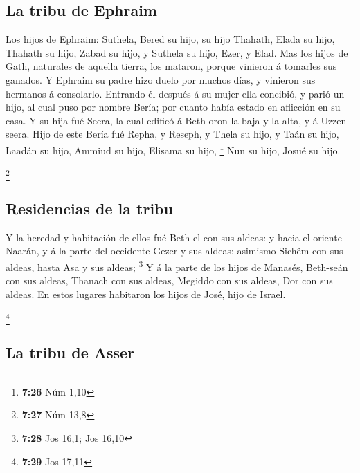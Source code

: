 \hypertarget{la-tribu-de-ephraim}{%
\subsection{La tribu de Ephraim}\label{la-tribu-de-ephraim}}

 Los hijos de Ephraim: Suthela, Bered su hijo, su hijo
Thahath, Elada su hijo, Thahath su hijo,  Zabad su hijo, y
Suthela su hijo, Ezer, y Elad. Mas los hijos de Gath, naturales de
aquella tierra, los mataron, porque vinieron á tomarles sus ganados.
 Y Ephraim su padre hizo duelo por muchos días, y vinieron
sus hermanos á consolarlo.  Entrando él después á su mujer
ella concibió, y parió un hijo, al cual puso por nombre Bería; por
cuanto había estado en aflicción en su casa.  Y su hija fué
Seera, la cual edificó á Beth-oron la baja y la alta, y á Uzzen-seera.
 Hijo de este Bería fué Repha, y Reseph, y Thela su hijo, y
Taán su hijo,  Laadán su hijo, Ammiud su hijo, Elisama su
hijo, \footnote{\textbf{7:26} Núm 1,10}  Nun su hijo, Josué
su hijo.

\footnote{\textbf{7:27} Núm 13,8}

\hypertarget{residencias-de-la-tribu}{%
\subsection{Residencias de la tribu}\label{residencias-de-la-tribu}}

 Y la heredad y habitación de ellos fué Beth-el con sus
aldeas: y hacia el oriente Naarán, y á la parte del occidente Gezer y
sus aldeas: asimismo Sichêm con sus aldeas, hasta Asa y sus aldeas;
\footnote{\textbf{7:28} Jos 16,1; Jos 16,10}  Y á la parte
de los hijos de Manasés, Beth-seán con sus aldeas, Thanach con sus
aldeas, Megiddo con sus aldeas, Dor con sus aldeas. En estos lugares
habitaron los hijos de José, hijo de Israel.

\footnote{\textbf{7:29} Jos 17,11}

\hypertarget{la-tribu-de-asser}{%
\subsection{La tribu de Asser}\label{la-tribu-de-asser}}


